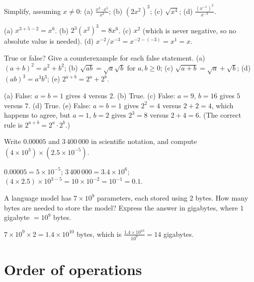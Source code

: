 \begin{exercise}
Simplify, assuming $x \neq 0$: (a) $\tfrac{x^3 \cdot x^5}{x^2}$; (b) $(2x^2)^3$;
(c) $\sqrt{x^4}$; (d) $\tfrac{(x^{-1})^2}{x^{-3}}$.
\end{exercise}
\begin{solution}
(a) $x^{3+5-2} = x^6$. (b) $2^3 (x^2)^3 = 8x^6$. (c) $x^2$ (which is never
negative, so no absolute value is needed). (d) $x^{-2}/x^{-3} = x^{-2-(-3)} =
x^1 = x$.
\end{solution}

\begin{exercise}
True or false? Give a counterexample for each false statement.
(a) $(a + b)^2 = a^2 + b^2$; (b) $\sqrt{ab} = \sqrt a\sqrt b$ for $a,b\ge0$;
(c) $\sqrt{a+b} = \sqrt a + \sqrt b$; (d) $(ab)^3 = a^3b^3$;
(e) $2^{a+b} = 2^a + 2^b$.
\end{exercise}
\begin{solution}
(a) False: $a=b=1$ gives $4$ versus $2$. (b) True. (c) False: $a=9$, $b=16$
gives $5$ versus $7$. (d) True. (e) False: $a = b = 1$ gives $2^2 = 4$ versus
$2 + 2 = 4$, which happens to agree, but $a=1$, $b=2$ gives $2^3 = 8$ versus
$2 + 4 = 6$. (The correct rule is $2^{a+b} = 2^a \cdot 2^b$.)
\end{solution}

\begin{exercise}
Write $0.00005$ and $3\,400\,000$ in scientific notation, and compute
$(4 \times 10^{3}) \times (2.5\times 10^{-5})$.
\end{exercise}
\begin{solution}
$0.00005 = 5\times10^{-5}$; $3\,400\,000 = 3.4\times10^{6}$;
$(4\times2.5)\times10^{3-5} = 10\times10^{-2} = 10^{-1} = 0.1$.
\end{solution}

\begin{exercise}
A language model has $7 \times 10^9$ parameters, each stored using $2$ bytes.
How many bytes are needed to store the model? Express the answer in gigabytes,
where $1$ gigabyte $= 10^9$ bytes.
\end{exercise}
\begin{solution}
$7\times10^9 \times 2 = 1.4\times10^{10}$ bytes, which is
$\tfrac{1.4\times10^{10}}{10^9} = 14$ gigabytes.
\end{solution}

\section{Order of operations}\label{sec:order-of-operations}

